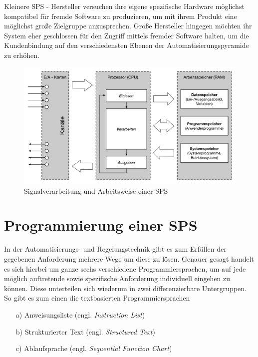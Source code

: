	Kleinere SPS - Hersteller versuchen ihre eigene spezifische Hardware möglichst kompatibel für fremde Software zu produzieren, um mit ihrem Produkt eine möglichst große Zielgruppe anzusprechen. Große Hersteller hingegen möchten ihr System eher geschlossen für den Zugriff mittels fremder Software halten, um die Kundenbindung auf den verschiedensten Ebenen der Automatisierungspyramide zu erhöhen.
	
	\begin{figure}[h!]
  		\centering
    	\includegraphics[width=1\textwidth]{graphics/stateoftheart/Signalverarbeitung_Selfmade.png}
  		\caption{Signalverarbeitung und Arbeitsweise einer SPS \cite{mseitz_sps}}
	\end{figure}
		
	\section{Programmierung einer SPS}

	In der Automatisierungs- und Regelungstechnik gibt es zum Erfüllen der gegebenen Anforderung mehrere Wege um diese zu lösen. Genauer gesagt handelt es sich hierbei um ganze sechs verschiedene Programmiersprachen, um auf jede möglich auftretende sowie spezifische Anforderung individuell eingehen zu können. Diese unterteilen sich wiederum in zwei differenzierbare Untergruppen. So gibt es zum einen die textbasierten Programmiersprachen
	
	\begin{itemize}
		\item[a)] Anweisungsliste (engl. \textit{Instruction List})
		\item[b)] Strukturierter Text (engl. \textit{Structured Text})
		\item[c)] Ablaufsprache (engl. \textit{Sequential Function Chart})
	\end{itemize}


